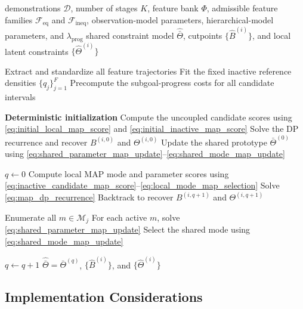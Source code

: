 \documentclass[lettersize,journal]{IEEEtran}
\begin{document}
\begin{algorithm}[t]
\caption{Regularized Hierarchical MAP Stage-wise Constraint Learning}
\label{alg:swcl_map}
\begin{algorithmic}[1]
\Require demonstrations $\mathcal{D}$, number of stages $K$,
feature bank $\Phi$, admissible feature families
$\mathcal{F}_{\mathrm{eq}}$ and $\mathcal{F}_{\mathrm{ineq}}$,
observation-model parameters, hierarchical-model parameters,
and $\lambda_{\mathrm{prog}}$
\Ensure shared constraint model $\hat{\bar{\Theta}}$,
cutpoints $\{\hat B^{(i)}\}$,
and local latent constraints $\{\hat\Theta^{(i)}\}$

\State Extract and standardize all feature trajectories
\State Fit the fixed inactive reference densities $\{q_j\}_{j=1}^{F}$
\State Precompute the subgoal-progress costs for all candidate intervals

\Statex
\State \textbf{Deterministic initialization}
    \State Compute the uncoupled candidate scores using
    \eqref{eq:initial_local_map_score} and
    \eqref{eq:initial_inactive_map_score}
    \State Solve the DP recurrence and recover
    $B^{(i,0)}$ and $\Theta^{(i,0)}$
\EndFor
\State Update the shared prototype $\bar{\Theta}^{(0)}$ using
\eqref{eq:shared_parameter_map_update}--\eqref{eq:shared_mode_map_update}

\Statex
\State $q\leftarrow0$
\Repeat
            \State Compute local MAP mode and parameter scores using
            \eqref{eq:inactive_candidate_map_score}--\eqref{eq:local_mode_map_selection}
        \EndFor
        \State Solve \eqref{eq:map_dp_recurrence}
        \State Backtrack to recover
        $B^{(i,q+1)}$ and $\Theta^{(i,q+1)}$
    \EndFor

            \State Enumerate all $m\in\mathcal{M}_j$
            \State For each active $m$, solve
            \eqref{eq:shared_parameter_map_update}
            \State Select the shared mode using
            \eqref{eq:shared_mode_map_update}
        \EndFor
    \EndFor

    \State $q\leftarrow q+1$
\State \Return
$\hat{\bar{\Theta}}=\bar{\Theta}^{(q)}$,
$\{\hat B^{(i)}\}$,
and $\{\hat\Theta^{(i)}\}$
\end{algorithmic}
\end{algorithm}


\subsection{Implementation Considerations}
\label{subsec:map_implementation}
\end{document}
